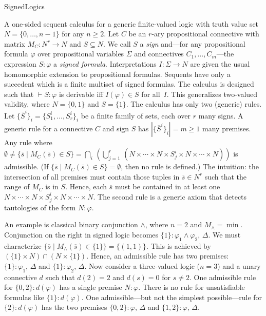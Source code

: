 \begin{entry}{SignedLogics}
\begin{clarifications}
  A one-sided sequent calculus for a generic finite-valued logic with
  truth value set $N=\{0,\ldots,n-1\}$ for any $n\geq2$. Let $C$ be an
  $r$-ary propositional connective with matrix $M_C:N^r\rightarrow N$
  and $S\subseteq N$.  We call $S$ a \emph{sign} and---for any
  propositional formula $\varphi$ over propositional variables
  $\Sigma$ and connectives $C_1,\ldots,C_m$---the expression
  $S{:}\varphi$ a \emph{signed formula}.  Interpretations
  $I:\Sigma\rightarrow N$ are given the usual homomorphic extension to
  propositional formulas.
  Sequents have only a succedent which is a finite multiset of signed
  formulas. The calculus is designed such that $\vdash S{:}\varphi$ is
  derivable iff $I(\varphi)\in S$ for all~$I$. This generalizes
  two-valued validity, where $N=\{0,1\}$ and $S=\{1\}$.
  The calculus has only two (generic) rules.  Let
  $\{\overline{S}^i\}_i=\{S_1^i,\ldots,S_r^i\}_i$ be a finite family
  of sets, each over $r$ many signs.  A generic rule for a connective
  $C$ and sign $S$ has $|\{\overline{S}^i\}_i|=m\geq1$ many premises.
  Any rule where
  $\emptyset\neq\{\overline{s}\mid M_C(\overline{s})\in
  S\}=\bigcap_i\,\left(\bigcup_{j=1}^r\,(N\times\cdots\times N\times
    S_j^i\times N\times\cdots\times N)\right) $
  is admissible. (If
  $\{\overline{s}\mid M_C(\overline{s})\in S\}=\emptyset$, then no
  rule is defined.)
  The intuition: the intersection of all premises must contain those
  tuples in $\overline{s}\in N^r$ such that the range of $M_C$ is in
  $S$. Hence, each $\overline{s}$ must be contained in at least one
  $N\times\cdots\times N\times S_j^i\times N\times\cdots\times N$. The
  second rule is a generic axiom that detects tautologies of the form
  $N{:}\varphi$.
  
  An example is classical binary conjunction $\wedge$, where $n=2$ and
  $M_\wedge=\min$.  Conjunction on the right in signed logic becomes
  $\{1\}:\varphi_1\wedge\varphi_2,\,\Delta$. We must characterize
  $\{\overline{s}\mid M_\wedge(\overline{s})\in\{1\}\}=\{(1,1)\}$.
  This is achieved by $(\{1\}\times N)\cap(N\times\{1\})$. Hence, an
  admissible rule has two premises: $\{1\}{:}\varphi_1,\,\Delta$ and
  $\{1\}{:}\varphi_2,\,\Delta$. Now consider a three-valued logic
  ($n=3$) and a unary connective $d$ such that $d(2)=2$ and $d(s)=0$
  for $s\neq2$. One admissible rule for $\{0,2\}{:}d(\varphi)$ has a
  single premise $N{:}\varphi$. There is no rule for unsatisfiable
  formulas like $\{1\}{:}d(\varphi)$. One admissible---but not the
  simplest possible---rule for $\{2\}{:}d(\varphi)$ has the two
  premises $\{0,2\}{:}\varphi,\,\Delta$ and
  $\{1,2\}{:}\varphi,\,\Delta$.


\end{clarifications}
\end{entry}
